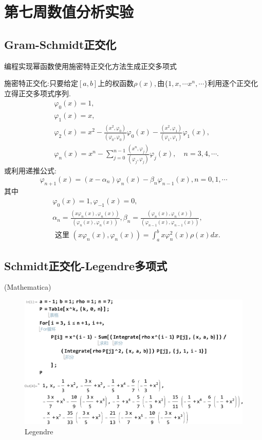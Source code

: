 \section{第七周数值分析实验}
\subsection{Gram-Schmidt正交化}
\begin{ex}
	编程实现幂函数使用施密特正交化方法生成正交多项式
	
	施密特正交化:只要给定$[a,b]$上的权函数$\rho \left( x \right),$由$\{1,x,\cdots x^n,\cdots \}$利用逐个正交化立得正交多项式序列.
	$$
	\begin{aligned}
		& \varphi_0(x)=1, \\
		& \varphi_1(x)=x, \\
		& \varphi_2(x)=x^2-\frac{\left(x^2, \varphi_0\right)}{\left(\varphi_0, \varphi_0\right)} \varphi_0(x)-\frac{\left(x^2, \varphi_1\right)}{\left(\varphi_1, \varphi_1\right)} \varphi_1(x), \\
		& \varphi_n(x)=x^n-\sum_{j=0}^{n-1} \frac{\left(x^n, \varphi_j\right)}{\left(\varphi_j, \varphi_j\right)} \varphi_j(x), \quad n=3,4, \cdots .
	\end{aligned}
	$$
	或利用递推公式:
	$$
	\varphi_{n+1}(x)=\left(x-\alpha_n\right) \varphi_n(x)-\beta_n \varphi_{n-1}(x), n=0,1, \cdots
	$$
	其中
	$$
	\begin{aligned}
		& \varphi_0(x)=1, \varphi_{-1}(x)=0, \\
		& \alpha_n=\frac{\left(x \varphi_n(x), \varphi_n(x)\right)}{\left(\varphi_n(x), \varphi_n(x)\right)}, \beta_n=\frac{\left(\varphi_n(x), \varphi_n(x)\right)}{\left(\varphi_{n-1}(x), \varphi_{n-1}(x)\right)}, \\
		& \text { 这里 }\left(x \varphi_n(x), \varphi_n(x)\right)=\int_a^b x \varphi_n^2(x) \rho(x) d x .
	\end{aligned}
	$$
\end{ex}

\subsection{Schmidt正交化-Legendre多项式}

\qa (Mathematica)
\begin{figure}[H]
	\centering
	\includegraphics[width = 0.8\linewidth]{day6/fig1.png}
	\caption{Legendre}
\end{figure}
